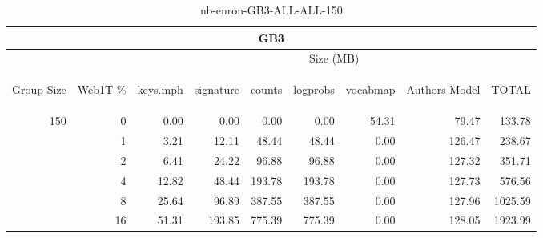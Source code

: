 \begin{center}
\begin{table}[htbp] 
 \begin{center}
\begin{tabular}{ | r | r | r | r | r | r | r | r | r |}
\hline
\multicolumn{9}{|c|}{GB3}\\
\hline
 & & \multicolumn{7}{|c|}{Size (MB)}\\ \cline{3-9}
\begin{sideways}Group Size\end{sideways} & \begin{sideways}Web1T \% \end{sideways} & \begin{sideways}keys.mph\end{sideways} & \begin{sideways}signature\end{sideways} & \begin{sideways}counts\end{sideways} & \begin{sideways}logprobs\end{sideways} & \begin{sideways}vocabmap\end{sideways} & \begin{sideways}Authors Model \end{sideways} & \begin{sideways}TOTAL\end{sideways}\\
\hline
\multirow{5}{*}{150}
 & 0 & 0.00 & 0.00 & 0.00 & 0.00 & 54.31 & 79.47 & 133.78\\ \cline{2-9}
 & 1 & 3.21 & 12.11 & 48.44 & 48.44 & 0.00 & 126.47 & 238.67\\ \cline{2-9}
 & 2 & 6.41 & 24.22 & 96.88 & 96.88 & 0.00 & 127.32 & 351.71\\ \cline{2-9}
 & 4 & 12.82 & 48.44 & 193.78 & 193.78 & 0.00 & 127.73 & 576.56\\ \cline{2-9}
 & 8 & 25.64 & 96.89 & 387.55 & 387.55 & 0.00 & 127.96 & 1025.59\\ \cline{2-9}
 & 16 & 51.31 & 193.85 & 775.39 & 775.39 & 0.00 & 128.05 & 1923.99\\ \cline{2-9}
\hline
\end{tabular}
\caption{nb-enron-GB3-ALL-ALL-150}
\label{table:nb-enron-GB3-ALL-ALL-150}
\end{center}
 \end{table}
\end{center}

